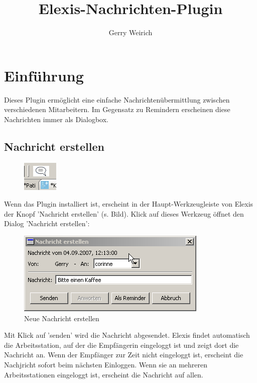\documentclass[a4paper]{scrartcl}
\begin{document}
\title{Elexis-Nachrichten-Plugin}
\author{Gerry Weirich}
\maketitle

\section{Einführung}
Dieses Plugin ermöglicht eine einfache Nachrichtenübermittlung zwischen verschiedenen Mitarbeitern. Im Gegensatz zu Remindern erscheinen diese Nachrichten immer als Dialogbox.

\subsection{Nachricht erstellen}
\begin{figure}
    \includegraphics{newmsg}
\end{figure}

\bigskip

Wenn das Plugin installiert ist, erscheint in der Haupt-Werkzeugleiste von Elexis der Knopf 'Nachricht erstellen' (s. Bild). Klick auf dieses Werkzeug öffnet den Dialog 'Nachricht erstellen':

\begin{figure}[htp!]
    \includegraphics{newmsg2}
    \caption{Neue Nachricht erstellen}
\end{figure}

Mit Klick auf 'senden' wird die Nachricht abgesendet. Elexis findet automatisch die Arbeitsstation, auf der die Empfängerin eingeloggt ist und zeigt dort die Nachricht an. Wenn der Empfänger zur Zeit nicht eingeloggt ist, erscheint die Nachjricht sofort beim nächsten Einloggen. Wenn sie an mehreren Arbeitsstationen eingeloggt ist, erscheint die Nachricht auf allen.

\bigskip
\end{document}
